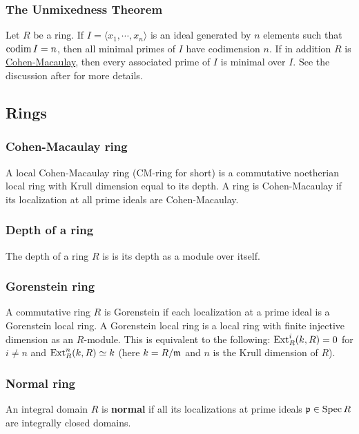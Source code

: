 \documentclass[11pt, english]{article}
\begin{document}
\subsubsection{The Unmixedness Theorem}
Let $R$ be a ring. If $I=\langle x_1,\cdots,x_n\rangle $ is an ideal generated by $n$ elements such that $\operatorname{codim} I=n$, then all minimal primes of $I$ have codimension $n$. If in addition $R$ is \hyperref[cmring]{Cohen-Macaulay}, then every associated prime of $I$ is minimal over $I$. See the discussion after \cite[Corollary 18.14]{eisenbud} for more details. 

\subsection{Rings}
\subsubsection{Cohen-Macaulay ring}
\label{cmring}
A local Cohen-Macaulay ring (CM-ring for short) is a commutative noetherian local ring with Krull dimension equal to its depth. A ring is Cohen-Macaulay if its localization at all prime ideals are Cohen-Macaulay.

\subsubsection{Depth of a ring}

The depth of a ring $R$ is is its depth as a module over itself.

\subsubsection{Gorenstein ring}

A commutative ring $R$ is Gorenstein if each localization at a prime ideal is a Gorenstein local ring. A Gorenstein local ring is a local ring with finite injective dimension as an $R$-module. This is equivalent to the following: $\operatorname{\mathrm{Ext}}_R^i(k,R)=0$ for $i \neq n$ and $\operatorname{\mathrm{Ext}}_R^n(k,R) \simeq k$ (here $k = R/\mathfrak{m}$ and $n$ is the Krull dimension of $R$).

\subsubsection{Normal ring}
\label{normalring}

An integral domain $R$ is \textbf{normal} if all its localizations at prime ideals ${\mathfrak{p} \in \operatorname{Spec} R}$ are integrally closed domains.  
\end{document}

